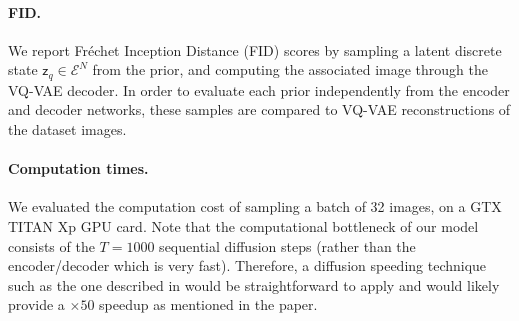 \documentclass[nolayout]{article}
\theoremstyle{plain}
\theoremstyle{definition}
\theoremstyle{remark}
\newcommand{\latentdis}{\mathsf{z}_q}
\newcommand{\embedspace}{\mathcal{E}}
\begin{document}
\paragraph{FID. }
We report Fr\'echet Inception Distance (FID) scores by sampling a latent discrete state $\latentdis \in \embedspace^N$ from the prior, and computing the associated image through the VQ-VAE decoder. In order to evaluate each prior independently from the encoder and decoder networks, these samples are compared to VQ-VAE reconstructions of the dataset images. 

\paragraph{Computation times. }
We evaluated the computation cost of sampling a batch of 32 images, on a GTX TITAN Xp GPU card. Note that the computational bottleneck of our model consists of the $T=1000$ sequential diffusion steps (rather than the encoder/decoder which is very fast). Therefore, a diffusion speeding technique such as the one described in \cite{song2021denoising} would be straightforward to apply and would likely provide a $\times 50$ speedup as mentioned in the paper. 

\begin{table}
    \caption{Results on \textit{mini}ImageNet. Metrics are computed on the validation dataset. The means are displayed along with the standard deviation in parenthesis.}
\centering
    \label{tab:miniimagenet}
\end{table}

\begin{table}
    \caption{Results on CIFAR10. Metrics are computed on the validation dataset. The means are displayed along with the standard deviation in parenthesis.}
\centering
    \label{tab:cifar}
\end{table}
\end{document}
